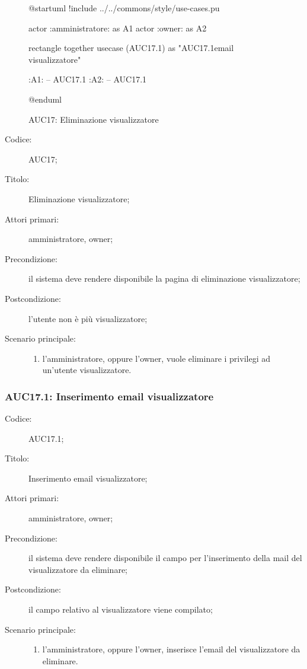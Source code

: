 \documentclass[../../../analisi-dei-requisiti.tex]{subfiles}
\begin{document}
\begin{figure}[H]
  \centering
  \begin{plantuml}
    @startuml
    !include ../../commons/style/use-cases.pu

    actor :amministratore: as A1
    actor :owner: as A2

    rectangle {
        together {
            usecase (AUC17.1) as "AUC17.1\nInserimento email visualizzatore"
          }
      }

    :A1: -- AUC17.1
    :A2: -- AUC17.1

    @enduml
  \end{plantuml}
  \caption{AUC17: Eliminazione visualizzatore}%
  \label{fig:auc17}
\end{figure}

\begin{description}
  \item[Codice:] AUC17;
  \item[Titolo:] Eliminazione visualizzatore;
  \item[Attori primari:] amministratore, owner;
  \item[Precondizione:] il sistema deve rendere disponibile la pagina di eliminazione visualizzatore;
  \item[Postcondizione:] l'utente non è più visualizzatore;
  \item[Scenario principale:]
        \begin{enumerate}
          \item l'amministratore, oppure l'owner, vuole eliminare i privilegi ad un'utente visualizzatore.
        \end{enumerate}
\end{description}

\subsubsection{AUC17.1: Inserimento email visualizzatore}%
\label{subs:AUC17.1}
\begin{description}
  \item[Codice:] AUC17.1;
  \item[Titolo:] Inserimento email visualizzatore;
  \item[Attori primari:] amministratore, owner;
  \item[Precondizione:] il sistema deve rendere disponibile il campo per l'inserimento della mail del visualizzatore da eliminare;
  \item[Postcondizione:] il campo relativo al visualizzatore viene compilato;
  \item[Scenario principale:]
        \begin{enumerate}
          \item l'amministratore, oppure l'owner, inserisce l'email del visualizzatore da eliminare.
        \end{enumerate}
\end{description}
\end{document}
